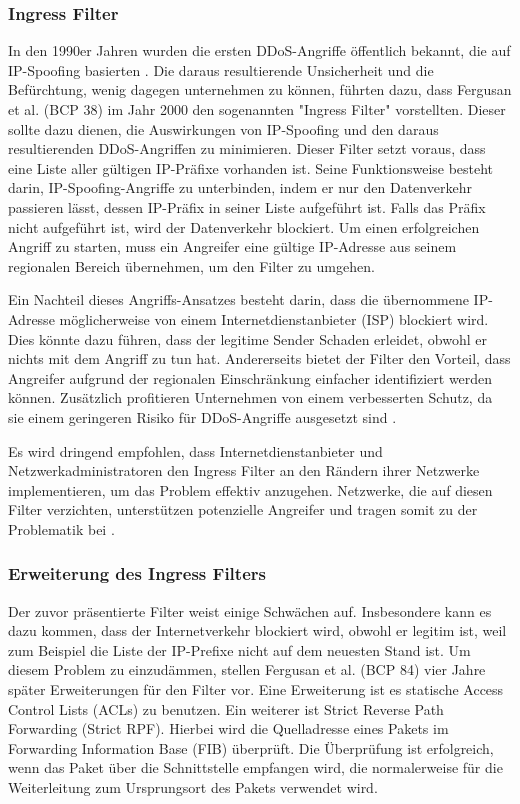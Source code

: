 \documentclass[sigplan,screen]{acmart}
\begin{document}
\subsubsection{Ingress Filter}
In den 1990er Jahren wurden die ersten DDoS-Angriffe öffentlich bekannt, die auf IP-Spoofing basierten \cite{CRP01}. Die daraus resultierende Unsicherheit und die Befürchtung, wenig dagegen unternehmen zu können, führten dazu, dass Fergusan et al. (BCP 38) \cite{Ingress01} im Jahr 2000 den sogenannten "Ingress Filter" vorstellten. Dieser sollte dazu dienen, die Auswirkungen von IP-Spoofing und den daraus resultierenden DDoS-Angriffen zu minimieren. Dieser Filter setzt voraus, dass eine Liste aller gültigen IP-Präfixe vorhanden ist. Seine Funktionsweise besteht darin, IP-Spoofing-Angriffe zu unterbinden, indem er nur den Datenverkehr passieren lässt, dessen IP-Präfix in seiner Liste aufgeführt ist. Falls das Präfix nicht aufgeführt ist, wird der Datenverkehr blockiert. Um einen erfolgreichen Angriff zu starten, muss ein Angreifer eine gültige IP-Adresse aus seinem regionalen Bereich übernehmen, um den Filter zu umgehen.

Ein Nachteil dieses Angriffs-Ansatzes besteht darin, dass die übernommene IP-Adresse möglicherweise von einem Internetdienstanbieter (ISP) blockiert wird. Dies könnte dazu führen, dass der legitime Sender Schaden erleidet, obwohl er nichts mit dem Angriff zu tun hat. Andererseits bietet der Filter den Vorteil, dass Angreifer aufgrund der regionalen Einschränkung einfacher identifiziert werden können. Zusätzlich profitieren Unternehmen von einem verbesserten Schutz, da sie einem geringeren Risiko für DDoS-Angriffe ausgesetzt sind \cite{BCP38}.

Es wird dringend empfohlen, dass Internetdienstanbieter und Netzwerkadministratoren den Ingress Filter an den Rändern ihrer Netzwerke implementieren, um das Problem effektiv anzugehen. Netzwerke, die auf diesen Filter verzichten, unterstützen potenzielle Angreifer und tragen somit zu der Problematik bei \cite{MANRS01}.

\subsubsection{Erweiterung des Ingress Filters}
Der zuvor präsentierte Filter weist einige Schwächen auf. Insbesondere kann es dazu kommen, dass der Internetverkehr blockiert wird, obwohl er legitim ist, weil zum Beispiel die Liste der IP-Prefixe nicht auf dem neuesten Stand ist. Um diesem Problem zu einzudämmen, stellen Fergusan et al. (BCP 84) \cite{Bcp84} vier Jahre später Erweiterungen für den Filter vor. Eine Erweiterung ist es statische Access Control Lists (ACLs) zu benutzen. Ein weiterer ist Strict Reverse Path Forwarding (Strict RPF). Hierbei wird die Quelladresse eines Pakets im Forwarding Information Base (FIB) überprüft. Die Überprüfung ist erfolgreich, wenn das Paket über die Schnittstelle empfangen wird, die normalerweise für die Weiterleitung zum Ursprungsort des Pakets verwendet wird.
\end{document}

